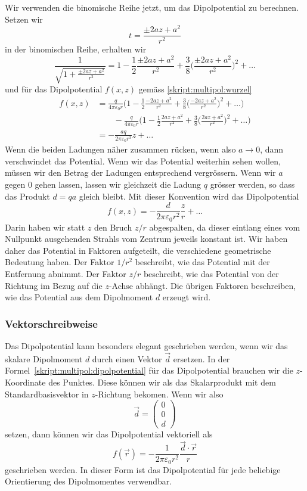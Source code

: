 Wir verwenden die binomische Reihe jetzt, um das Dipolpotential
zu berechnen.
Setzen wir 
\[
t=\frac{\pm 2az+a^2}{r^2}
\]
in der binomischen Reihe, erhalten wir
\[
\frac{1}{\sqrt{1+\frac{\pm 2az+a^2}{r^2}}}
=
1-\frac12\frac{\pm 2az+a^2}{r^2}
+
\frac38 \biggl(\frac{\pm 2az+a^2}{r^2}\biggr)^2+\dots
\]
und für das Dipolpotential $f(x,z)$ gemäss \eqref{skript:multipol:wurzel}
\begin{align*}
f(x,z)
&=
\frac{q}{4\pi\varepsilon_0 r}
\biggl(
1-\frac12\frac{-2az+a^2}{r^2} + \frac38 \biggl(\frac{-2az+a^2}{r^2}\biggr)^2+\dots
\biggr)
\\
&\qquad
-
\frac{q}{4\pi\varepsilon_0 r}
\biggl(
1-\frac12\frac{2az+a^2}{r^2} + \frac38 \biggl(\frac{2az+a^2}{r^2}\biggr)^2+\dots
\biggr)
\\
&=
-\frac{aq}{2\pi\varepsilon_0r^3}z + \dots
\end{align*}
Wenn die beiden Ladungen näher zusammen rücken, wenn also $a\to 0$,
dann verschwindet das Potential.
Wenn wir das Potential weiterhin sehen wollen, müssen wir den Betrag
der Ladungen entsprechend vergrössern.
Wenn wir $a$ gegen $0$ gehen lassen, lassen wir gleichzeit die Ladung
$q$ grösser werden, so dass das Produkt $d=qa$ gleich bleibt.
Mit dieser Konvention wird das Dipolpotential
\begin{equation}
f(x,z) = -\frac{d}{2\pi\varepsilon_0 r^2}\frac{z}{r}+\dots
\label{skript:multipol:dipolpotential}
\end{equation}
Darin haben wir statt $z$ den Bruch $z/r$ abgespalten, da dieser
eintlang eines vom Nullpunkt ausgehenden Strahls vom Zentrum jeweils
konstant ist.
Wir haben daher das Potential in Faktoren aufgeteilt, die verschiedene
geometrische Bedeutung haben.
Der Faktor $1/r^2$ beschreibt, wie das Potential mit der Entfernung abnimmt.
Der Faktor $z/r$ beschreibt, wie das Potential von der Richtung im
Bezug auf die $z$-Achse abhängt.
Die übrigen Faktoren beschreiben, wie das Potential aus dem Dipolmoment
$d$ erzeugt wird.

\subsubsection{Vektorschreibweise}
Das Dipolpotential kann besonders elegant geschrieben werden, wenn
wir das skalare Dipolmoment $d$ durch einen Vektor $\vec{d}$ ersetzen.
In der Formel~\eqref{skript:multipol:dipolpotential}
für das Dipolpotential brauchen wir die $z$-Koordinate
des Punktes.
Diese können wir als das Skalarprodukt mit dem Standardbasisvektor
in $z$-Richtung bekomen.
Wenn wir also
\[
\vec{d}=\begin{pmatrix}0\\0\\d\end{pmatrix}
\]
setzen, dann können wir das Dipolpotential vektoriell als
\begin{equation*}
f(\vec{r})
=
-
\frac{1}{2\pi\varepsilon_0r^2} \frac{\vec{d}\cdot\vec{r}}{r}
\end{equation*}
geschrieben werden.
In dieser Form ist das Dipolpotential für jede beliebige Orientierung
des Dipolmomentes verwendbar.

